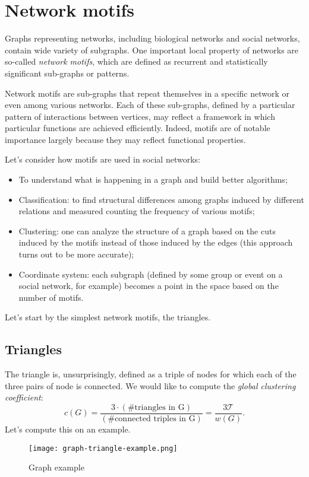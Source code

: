 \chapter{Network motifs}\label{sec:motifs}

Graphs representing networks, including biological networks and social networks, contain wide variety of subgraphs. One important local property of networks are so-called \emph{network motifs}, which are defined as recurrent and statistically significant sub-graphs or patterns.

Network motifs are sub-graphs that repeat themselves in a specific network or even among various networks. Each of these sub-graphs, defined by a particular pattern of interactions between vertices, may reflect a framework in which particular functions are achieved efficiently. Indeed, motifs are of notable importance largely because they may reflect functional properties.

Let's consider how motifs are used in social networks:
   \begin{itemize}
       \item To understand what is happening in a graph and build better algorithms;
       \item Classification: to find structural differences among graphs induced by different relations and measured counting the frequency of various motifs;
       \item Clustering: one can analyze the structure of a graph based on the cuts induced by the motifs instead of those induced by the edges (this approach turns out to be more accurate);
       \item Coordinate system: each subgraph (defined by some group or event on a social network, for example) becomes a point in the space based on the number of motifs.
   \end{itemize}

Let's start by the simplest network motifs, the triangles.


\section{Triangles}\label{sec:triangles}

The triangle is, unsurprisingly, defined as a triple of nodes for which each of the three pairs of node is connected. 
We would like to compute the \emph{global clustering coefficient}:
\begin{equation}\label{eq:clustering-coefficient}
    c(G) = \frac{3 \cdot \left(\text{\# triangles in G}\right)}{\left(\text{\# connected triples in G}\right)} = \frac{3 \mathcal{T}}{w(G)}.
\end{equation}
%
Let's compute this on an example.
%
\begin{figure}[h!]
	\centering
	\texttt{[image: graph-triangle-example.png]}
	\caption{Graph example}\label{fig:graph-example-triangles}
\end{figure}

